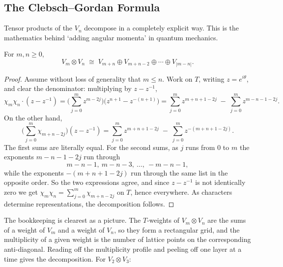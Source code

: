 \subsection{The Clebsch--Gordan Formula}

Tensor products of the $V_n$ decompose in a completely explicit way. This is the mathematics behind `adding angular momenta' in quantum mechanics.

\begin{theorem}
	For $m, n\geq0$,
	$$V_m\otimes V_n \; \cong \; V_{m+n}\oplus V_{m+n-2}\oplus\cdots\oplus V_{|m-n|}.$$
\end{theorem}
\begin{proof}
	Assume without loss of generality that $m\leq n$. Work on $T$, writing $z = e^{i\theta}$, and clear the denominator: multiplying by $z - z^{-1}$,
	$$\chi_m\chi_n\cdot(z-z^{-1}) = \Big(\sum_{j=0}^mz^{m-2j}\Big)\big(z^{n+1}-z^{-(n+1)}\big) = \sum_{j=0}^m z^{m+n+1-2j} \; - \; \sum_{j=0}^mz^{m-n-1-2j}.$$
	On the other hand,
	$$\Big(\sum_{j=0}^m\chi_{m+n-2j}\Big)(z-z^{-1}) = \sum_{j=0}^m z^{m+n+1-2j} \; - \; \sum_{j=0}^m z^{-(m+n+1-2j)}.$$
	The first sums are literally equal. For the second sums, as $j$ runs from $0$ to $m$ the exponents $m-n-1-2j$ run through
	$$m-n-1,\ m-n-3,\ \dots,\ -m-n-1,$$
	while the exponents $-(m+n+1-2j)$ run through the same list in the opposite order. So the two expressions agree, and since $z - z^{-1}$ is not identically zero we get $\chi_m\chi_n = \sum_{j=0}^m\chi_{m+n-2j}$ on $T$, hence everywhere. As characters determine representations, the decomposition follows.
\end{proof}

The bookkeeping is clearest as a picture. The $T$-weights of $V_m\otimes V_n$ are the sums of a weight of $V_m$ and a weight of $V_n$, so they form a rectangular grid, and the multiplicity of a given weight is the number of lattice points on the corresponding anti-diagonal. Reading off the multiplicity profile and peeling off one layer at a time gives the decomposition. For $V_2\otimes V_3$:

